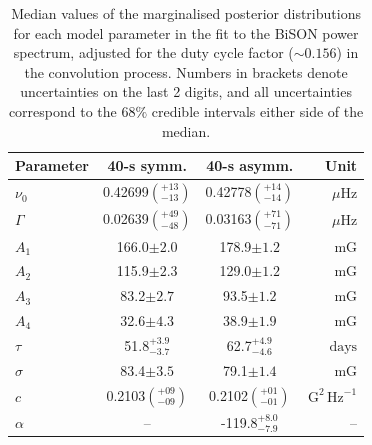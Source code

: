 \begin{table}[ht!]
	\begin{center}
		\caption{Median values of the marginalised posterior distributions for each model parameter in the fit to the BiSON power spectrum, adjusted for the duty cycle factor ($\sim 0.156$) in the convolution process. Numbers in brackets denote uncertainties on the last 2 digits, and all uncertainties correspond to the $68 \%$ credible intervals either side of the median.}
		\label{tab:PSD_fit_params}
		\begin{tabular}{l c c r}
			\hline
			{\bf Parameter} & {\bf 40-s symm.} & {\bf 40-s asymm.} & {\bf Unit} \\
			\hline
			
			{$\nu_0$} & {0.42699$\left(_{-13}^{+13}\right)$} & {0.42778$\left(_{-14}^{+14}\right)$} & {$\mu\mathrm{Hz} $}\\
			
			{$\Gamma$} & {0.02639$\left(_{-48}^{+49}\right)$} & {0.03163$\left(_{-71}^{+71}\right)$} & {$\mu\mathrm{Hz} $} \\
			
			{$A_1$} & {166.0$\pm 2.0$} & {178.9$\pm 1.2$} & {$\mathrm{mG}$} \\
			
			{$A_2$} & {115.9$\pm 2.3$} & {129.0$\pm 1.2$} & {$\mathrm{mG}$} \\
			
			{$A_3$} & {83.2$\pm 2.7$} & {93.5$\pm 1.2$} & {$\mathrm{mG}$} \\
			
			{$A_4$} & {32.6$\pm 4.3$} & {38.9$\pm 1.9$} &  {$\mathrm{mG}$} \\	
			
			{$\tau$} & {51.8$_{-3.7}^{+3.9}$} & {62.7$_{-4.6}^{+4.9}$} & {$\mathrm{days}$} \\	
			
			{$\sigma$} & {83.4$\pm 3.5$} & {79.1$\pm 1.4$} &  {$\mathrm{mG}$} \\	
			
			{$c$} & {0.2103$\left(_{-09}^{+09}\right)$} & {0.2102$\left(_{-01}^{+01}\right)$}  & {$\mathrm{G}^2 \, \mathrm{Hz}^{-1}$} \\	
			
			{$\alpha$} & {--} & {-119.8$_{-7.9}^{+8.0}$} & {--} \\	
			\hline
		\end{tabular}
	\end{center}
\end{table}


